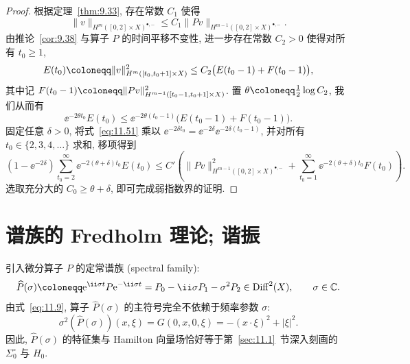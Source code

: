 \begin{proof}
根据定理~\ref{thm:9.33}, 存在常数 $C_1$ 使得
\begin{equation}\label{eq:11.49}
    \|v\|_{H^m([0, 2] \times X)^{\bullet, -}} \le C_1 \|Pv\|_{H^{m-1}([0, 2] \times X)^{\bullet, -}}.
\end{equation}
由推论~\ref{cor:9.38} 与算子 $P$ 的时间平移不变性, 进一步存在常数 $C_2 > 0$ 使得对所有 $t_0 \ge 1$,
\begin{equation}\label{eq:11.50}
    E(t_0) \defeq \|v\|_{H^m([t_0, t_0+1] \times X)}^2 \le C_2 \big( E(t_0 - 1) + F(t_0 - 1) \big),
\end{equation}
其中记 $F(t_0 - 1) \defeq \|Pv\|_{H^{m-1}([t_0-1, t_0+1] \times X)}^2$. 置 $\theta \defeq \frac{1}{2}\log C_2$, 我们从而有
\begin{equation}\label{eq:11.51}
    \ee^{-2\theta t_0} E(t_0) \le \ee^{-2\theta(t_0 - 1)} \big( E(t_0 - 1) + F(t_0 - 1) \big).
\end{equation}
固定任意 $\delta > 0$, 将式~\eqref{eq:11.51} 乘以 $\ee^{-2\delta t_0} = \ee^{-2\delta} \ee^{-2\delta(t_0 - 1)}$, 并对所有 $t_0 \in \{2, 3, 4, \ldots\}$ 求和, 移项得到
\[
    (1 - \ee^{-2\delta}) \sum_{t_0=2}^\infty \ee^{-2(\theta+\delta)t_0} E(t_0) \le C' \left( \|Pv\|_{H^{m-1}([0, 2] \times X)^{\bullet, -}}^2 + \sum_{t_0=1}^\infty \ee^{-2(\theta+\delta)t_0} F(t_0) \right).
\]
选取充分大的 $C_0 \ge \theta + \delta$, 即可完成弱指数界的证明.
\end{proof}

\section{谱族的 Fredholm 理论; 谐振}\label{sec:11.3}
%
%
%

引入微分算子 $P$ 的定常谱族 (spectral family):
\begin{equation}\label{eq:11.52}
    \widehat{P}(\sigma) \defeq \ee^{\ii \sigma t} P \ee^{-\ii \sigma t} = P_0 - \ii \sigma P_1 - \sigma^2 P_2 \in \Diff^2(X), \qquad \sigma \in \mathbb{C}.
\end{equation}
由式~\eqref{eq:11.9}, 算子 $\widehat{P}(\sigma)$ 的主符号完全不依赖于频率参数 $\sigma$:
\begin{equation}\label{eq:11.53}
    \sigma^2(\widehat{P}(\sigma))(x, \xi) = G(0, x, 0, \xi) = -(x \cdot \xi)^2 + |\xi|^2.
\end{equation}
因此, $\widehat{P}(\sigma)$ 的特征集与 Hamilton 向量场恰好等于第~\ref{sec:11.1}~节深入刻画的 $\Sigma_0^\circ$ 与 $H_0$.

